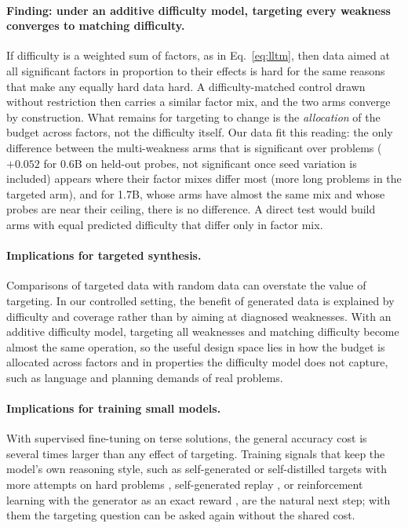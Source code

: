 \documentclass[11pt]{article}
\begin{document}
\paragraph{Finding: under an additive difficulty model, targeting every weakness converges to matching difficulty.}
If difficulty is a weighted sum of factors, as in Eq.~\eqref{eq:lltm}, then data aimed at all significant factors in
proportion to their effects is hard for the same reasons that make any equally hard data hard. A difficulty-matched
control drawn without restriction then carries a similar factor mix, and the two arms converge by construction. What
remains for targeting to change is the \emph{allocation} of the budget across factors, not the difficulty itself. Our
data fit this reading: the only difference between the multi-weakness arms that is significant over problems ($+0.052$
for 0.6B on held-out probes, not significant once seed variation is included) appears where their factor mixes differ most (more long problems in the targeted arm), and for 1.7B, whose arms
have almost the same mix and whose probes are near their ceiling, there is no difference. A direct test would build arms
with equal predicted difficulty that differ only in factor mix.

\paragraph{Implications for targeted synthesis.} Comparisons of targeted data with random data can overstate the value
of targeting. In our controlled setting, the benefit of generated data is explained by difficulty and coverage rather
than by aiming at diagnosed weaknesses. With an additive difficulty model, targeting all weaknesses and matching
difficulty become almost the same operation, so the useful design space lies in how the budget is allocated across
factors and in properties the difficulty model does not capture, such as language and planning demands of real problems.

\paragraph{Implications for training small models.} With supervised fine-tuning on terse solutions, the general accuracy
cost is several times larger than any effect of targeting. Training signals that keep the model's own reasoning style,
such as self-generated or self-distilled targets with more attempts on hard problems
\citep{zelikman2022star,yang2024sdft,tong2024dart}, self-generated
replay \citep{sun2026talking}, or reinforcement learning with the generator as an exact reward
\citep{liang2025sws,shenfeld2025razor,chu2025sft}, are the natural next step; with them the targeting question can be
asked again without the shared cost.
\end{document}
